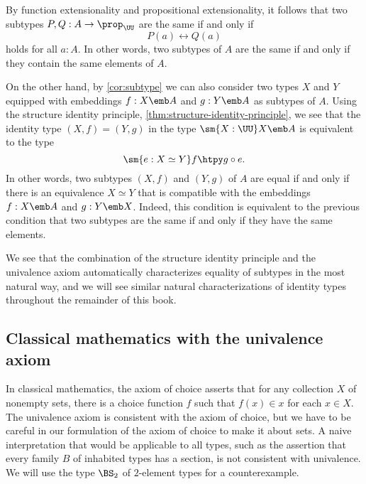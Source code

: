 \begin{rmk}
  By function extensionality and propositional extensionality, it follows that two subtypes $P,Q:A\to\prop_\UU$ are the same if and only if
\begin{equation*}
  P(a)\leftrightarrow Q(a)
\end{equation*}
holds for all $a:A$. In other words, two subtypes of $A$ are the same if and only if they contain the same elements of $A$.

On the other hand, by \cref{cor:subtype} we can also consider two types $X$ and $Y$ equipped with embeddings $f:X\emb A$ and $g:Y\emb A$ as subtypes of $A$. Using the structure identity principle, \cref{thm:structure-identity-principle}, we see that the identity type $(X,f)=(Y,g)$ in the type $\sm{X:\UU}X\emb A$ is equivalent to the type
\begin{equation*}
  \sm{e:X\simeq Y}f\htpy g\circ e.
\end{equation*}
In other words, two subtypes $(X,f)$ and $(Y,g)$ of $A$ are equal if and only if there is an equivalence $X\simeq Y$ that is compatible with the embeddings $f:X\emb A$ and $g:Y\emb X$. Indeed, this condition is equivalent to the previous condition that two subtypes are the same if and only if they have the same elements.

We see that the combination of the structure identity principle and the univalence axiom automatically characterizes equality of subtypes in the most natural way, and we will see similar natural characterizations of identity types throughout the remainder of this book.
\end{rmk}

\subsection{Classical mathematics with the univalence axiom}

In classical mathematics, the axiom of choice asserts that for any collection $X$ of nonempty sets, there is a choice function $f$ such that $f(x)\in x$ for each $x\in X$. The univalence axiom is consistent with the axiom of choice, but we have to be careful in our formulation of the axiom of choice to make it about sets. A naive interpretation that would be applicable to all types, such as the assertion that every family $B$ of inhabited types has a section, is not consistent with univalence. We will use the type $\BS_2$ of $2$-element types for a counterexample.

